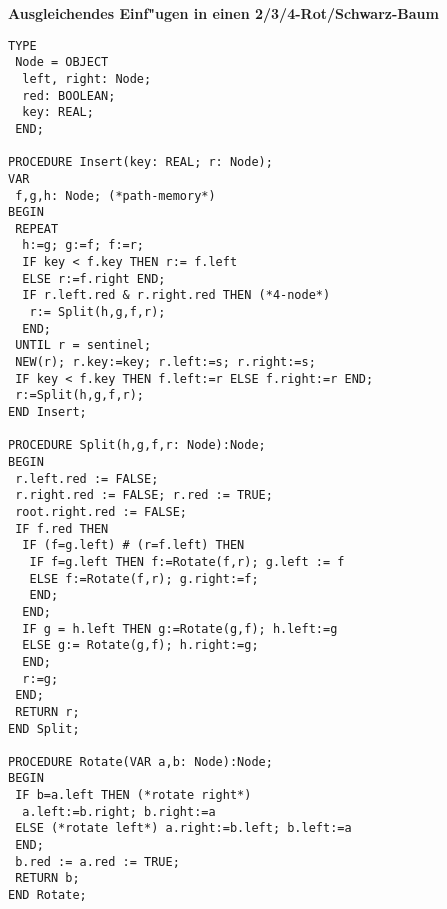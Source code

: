 \documentclass[10pt, a4paper, twocolumn]{scrartcl}
\begin{document}
{\bf Ausgleichendes Einf"ugen in einen 2/3/4-Rot/Schwarz-Baum}
\begin{verbatim}
TYPE
 Node = OBJECT
  left, right: Node;
  red: BOOLEAN;
  key: REAL;
 END;

PROCEDURE Insert(key: REAL; r: Node);
VAR
 f,g,h: Node; (*path-memory*)
BEGIN
 REPEAT
  h:=g; g:=f; f:=r;
  IF key < f.key THEN r:= f.left
  ELSE r:=f.right END;
  IF r.left.red & r.right.red THEN (*4-node*)
   r:= Split(h,g,f,r);
  END;
 UNTIL r = sentinel;
 NEW(r); r.key:=key; r.left:=s; r.right:=s;
 IF key < f.key THEN f.left:=r ELSE f.right:=r END;
 r:=Split(h,g,f,r);
END Insert;

PROCEDURE Split(h,g,f,r: Node):Node;
BEGIN
 r.left.red := FALSE;
 r.right.red := FALSE; r.red := TRUE;
 root.right.red := FALSE;
 IF f.red THEN
  IF (f=g.left) # (r=f.left) THEN
   IF f=g.left THEN f:=Rotate(f,r); g.left := f
   ELSE f:=Rotate(f,r); g.right:=f;
   END;
  END;
  IF g = h.left THEN g:=Rotate(g,f); h.left:=g
  ELSE g:= Rotate(g,f); h.right:=g;
  END;
  r:=g;
 END;
 RETURN r;
END Split;

PROCEDURE Rotate(VAR a,b: Node):Node;
BEGIN
 IF b=a.left THEN (*rotate right*)
  a.left:=b.right; b.right:=a
 ELSE (*rotate left*) a.right:=b.left; b.left:=a
 END;
 b.red := a.red := TRUE;
 RETURN b;
END Rotate;
\end{verbatim}
\end{document}
